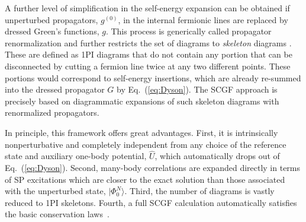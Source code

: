 A further level of simplification in the self-energy expansion 
can be obtained if unperturbed propagators, $g^{(0)}$, in the internal fermionic lines are replaced by dressed Green's functions, $g$. 
This process is generically called propagator renormalization and 
further restricts the set of diagrams to \emph{skeleton} diagrams \cite{Dickhoff2008}.
These are defined as 1PI diagrams that do not contain 
any portion that can be disconnected by cutting a fermion line twice at any two different points. 
These portions would correspond to self-energy insertions, which are already re-summed into the dressed propagator $G$ by Eq.~(\ref{eq:Dyson}).
The SCGF approach is precisely based on diagrammatic expansions of such skeleton diagrams 
with renormalized propagators.

In principle, this framework offers great advantages. First, it is intrinsically nonperturbative and completely
independent from any choice of the reference state and auxiliary one-body potential, $\hat{U}$, 
which automatically drops out of Eq.~(\ref{eq:Dyson}). 
Second, many-body correlations are expanded directly in terms of SP excitations which are closer
to the exact solution than those associated with the unperturbed state, $\vert\Phi_0^N\rangle$. Third, 
the number of diagrams is vastly reduced to 1PI skeletons. 
Fourth, a full SCGF calculation automatically satisfies the basic conservation
laws~\cite{Baym1961,Baym1962,Dickhoff2008}. 

